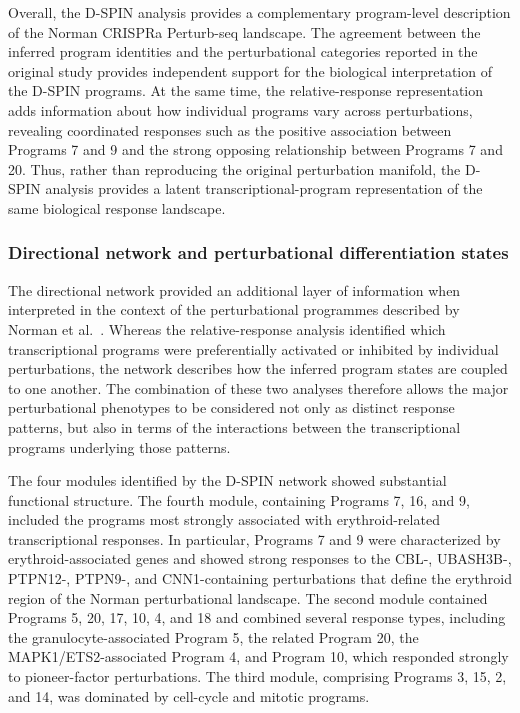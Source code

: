 \documentclass[11pt,a4paper]{article}
\begin{document}
Overall, the D-SPIN analysis provides a complementary program-level description of the Norman CRISPRa Perturb-seq landscape. The agreement between the inferred program identities and the perturbational categories reported in the original study provides independent support for the biological interpretation of the D-SPIN programs. At the same time, the relative-response representation adds information about how individual programs vary across perturbations, revealing coordinated responses such as the positive association between Programs 7 and 9 and the strong opposing relationship between Programs 7 and 20. Thus, rather than reproducing the original perturbation manifold, the D-SPIN analysis provides a latent transcriptional-program representation of the same biological response landscape.

\subsubsection{Directional network and perturbational differentiation states}

The directional network provided an additional layer of information when interpreted in the context of the perturbational programmes described by Norman et al.~\citep{Norman2019}. Whereas the relative-response analysis identified which transcriptional programs were preferentially activated or inhibited by individual perturbations, the network describes how the inferred program states are coupled to one another. The combination of these two analyses therefore allows the major perturbational phenotypes to be considered not only as distinct response patterns, but also in terms of the interactions between the transcriptional programs underlying those patterns.

The four modules identified by the D-SPIN network showed substantial functional structure. The fourth module, containing Programs 7, 16, and 9, included the programs most strongly associated with erythroid-related transcriptional responses. In particular, Programs 7 and 9 were characterized by erythroid-associated genes and showed strong responses to the CBL-, UBASH3B-, PTPN12-, PTPN9-, and CNN1-containing perturbations that define the erythroid region of the Norman perturbational landscape. The second module contained Programs 5, 20, 17, 10, 4, and 18 and combined several response types, including the granulocyte-associated Program 5, the related Program 20, the MAPK1/ETS2-associated Program 4, and Program 10, which responded strongly to pioneer-factor perturbations. The third module, comprising Programs 3, 15, 2, and 14, was dominated by cell-cycle and mitotic programs.
\end{document}
